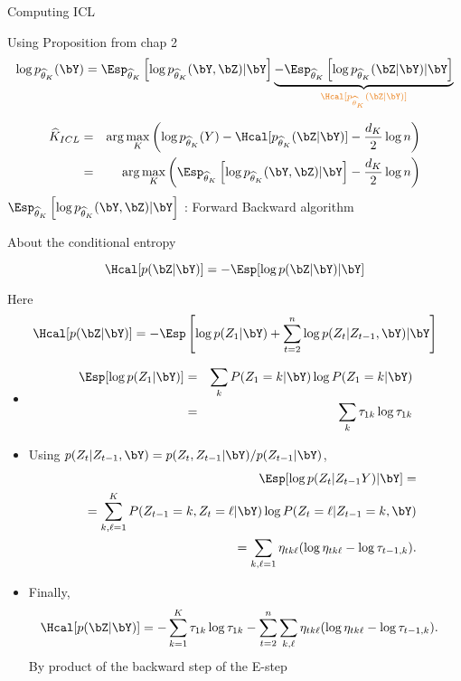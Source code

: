 \documentclass[compress,10pt]{beamer}
\begin{document}
\begin{frame}{Computing ICL}

Using Proposition from chap 2
$$
\log p_{\widehat{\theta}_K}(\bY) = 
\Esp_{\widehat{\theta}_K} \left[\log p_{\widehat{\theta}_K}(\bY, \bZ) | \bY\right]   \underbrace{ - \Esp_{\widehat{\theta}_K} \left[\log p_{\widehat{\theta}_K}(\bZ |\bY)|\bY\right]}_{\color{dgreen}\Hcal[p_{\widehat{\theta}_K}(\bZ | \bY)]}
$$

\begin{eqnarray*}
  \widehat{K}_{ICL} &=& \arg\max_K \left(\log p_{\widehat{\theta}_K}(Y) - \Hcal[p_{\widehat{\theta}_K}(\bZ | \bY)]- \frac{d_K}2 \log n\right)\\
  &=& \arg\max_K \left(\Esp_{\widehat{\theta}_K} \left[\log p_{\widehat{\theta}_K}(\bY, \bZ) | \bY\right] - \frac{d_K}2 \log n\right)
\end{eqnarray*}
$\Esp_{\widehat{\theta}_K} \left[\log p_{\widehat{\theta}_K}(\bY, \bZ) | \bY\right]$ : Forward Backward algorithm

 \end{frame}

\begin{frame}[allowframebreaks]{About the conditional entropy}


$$
\Hcal[p(\bZ|\bY)] = - \Esp[ \log p(\bZ|\bY) | \bY]
$$

Here 
$$
\Hcal[p(\bZ|\bY)]  = - \Esp\left[ \log p(Z_1|\bY) + \sum_{t=2}^n \log p(Z_t| Z_{t-1}, \bY) | \bY \right]
$$
\begin{itemize}
 \item \begin{eqnarray*}
\Esp[ \log p(Z_1|\bY) ] &=& \sum_k P(Z_1=k|\bY) \log P(Z_1=k | \bY)\\ &=& \sum_k \tau_{1k} \log \tau_{1k}
\end{eqnarray*}
\item  Using $p(Z_t| Z_{t-1}, \bY) = p(Z_t, Z_{t-1} | \bY) / p(Z_{t-1} | \bY)$,
\begin{eqnarray*}
&&  \Esp[ \log p(Z_t| Z_{t-1} Y) | \bY] = \\
&& = \sum_{k, \ell= 1}^K P(Z_{t-1}=k, Z_t = \ell | \bY) \log P(Z_t=\ell | Z_{t-1}=k, \bY) \\
&& = \sum_{k, \ell=1} \eta_{tk\ell} (\log \eta_{tk\ell} - \log \tau_{t-1, k}).
\end{eqnarray*}



\item Finally, 
\begin{align*}
 \Hcal[p(\bZ|\bY)] & = - \sum_{k=1}^K \tau_{1k} \log \tau_{1k} - \sum_{t=2}^n \sum_{k, \ell} \eta_{tk\ell} (\log \eta_{tk\ell} - \log \tau_{t-1, k}).
\end{align*}
By product of the backward step of the E-step
\end{itemize}
\end{frame}
\end{document}
